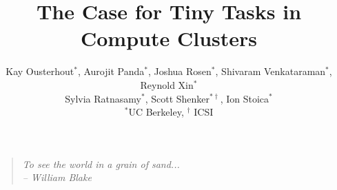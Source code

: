 \documentclass[pdftex,twocolumn,10pt,letterpaper]{article}
\begin{document}
\title{\large \bf The Case for Tiny Tasks in Compute Clusters}
\author{
{\rm Kay Ousterhout$^*$, Aurojit Panda$^*$, Joshua Rosen$^*$, Shivaram Venkataraman$^*$, Reynold Xin$^*$}\\
\rm{Sylvia Ratnasamy$^*$, Scott Shenker$^{*\dag}$, Ion Stoica$^*$} \\
$^*$UC Berkeley, $^\dag$ ICSI
}
\date{\vspace{1in}}


\maketitle
\vspace{1in}

\begin{quote}
  \textit{To see the world in a grain of sand...}\\
  \textit{-- William Blake}
\end{quote}





%




\end{document}
